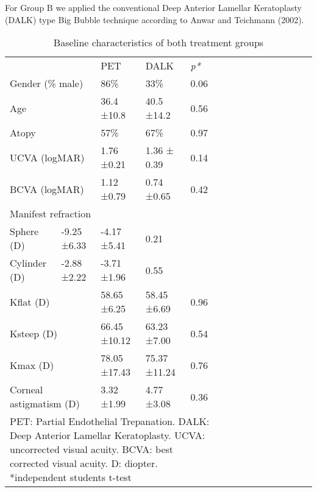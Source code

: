 \documentclass[authordate, empirical,issue]{jote-new-article}
\begin{document}
	For Group B we applied the conventional Deep Anterior Lamellar Keratoplasty (DALK) type Big Bubble technique according to Anwar and Teichmann (2002).

	\begin{table}[H]
		\begin{fullwidth}
			\caption{Baseline characteristics of both treatment groups}
			\begin{tabularx}{\linewidth}{@{} l l l l l l l l l l l l l l l @{}}
				\toprule
	
			 	  &   & PET & DALK & \emph{p*} \\
	
			 	\multicolumn{2}{l}{Gender (\% male)} & 86\% & 33\% & 0.06 \\
	
			 	\multicolumn{2}{l}{Age} & 36.4 ±10.8 & 40.5 ±14.2 & 0.56 \\
	
			 	\multicolumn{2}{l}{Atopy} & 57\% & 67\% & 0.97 \\
	
			 	\multicolumn{2}{l}{UCVA (logMAR)} & 1.76 ±0.21 & 1.36 ± 0.39 & 0.14 \\
	
			 	\multicolumn{2}{l}{BCVA (logMAR)} & 1.12 ±0.79 & 0.74 ±0.65 & 0.42 \\
	
			 	\multicolumn{2}{l}{Manifest refraction} &   &   &   \\
	
			 	Sphere (D) & -9.25 ±6.33 & -4.17 ±5.41 & 0.21 \\
	
			 	Cylinder (D) & -2.88 ±2.22 & -3.71 ±1.96 & 0.55 \\
	
			 	\multicolumn{2}{l}{Kflat (D)} & 58.65 ±6.25 & 58.45 ±6.69 & 0.96 \\
	
			 	\multicolumn{2}{l}{Ksteep (D)} & 66.45 ±10.12 & 63.23 ±7.00 & 0.54 \\
	
			 	\multicolumn{2}{l}{Kmax (D)} & 78.05 ±17.43 & 75.37 ±11.24 & 0.76 \\
	
			 	\multicolumn{2}{l}{Corneal astigmatism (D)} & 3.32 ±1.99 & 4.77 ±3.08 & 0.36 \\
	
				\bottomrule
				\multicolumn{5}{l}{\parbox[t]{0.9\textwidth}{PET: Partial Endothelial Trepanation. DALK: Deep Anterior Lamellar Keratoplasty. UCVA: uncorrected visual acuity. BCVA: best corrected visual acuity. D: diopter. *independent students t-test}}
			\end{tabularx}	
		\end{fullwidth}
	\end{table}
\end{document}
